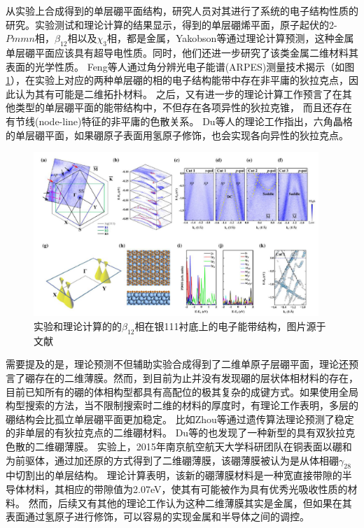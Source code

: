 从实验上合成得到的单层硼平面结构，研究人员对其进行了系统的电子结构性质的研究。实验测试和理论计算的结果显示，得到的单层硼烯平面，原子起伏的2-$Pmmn$相，$\beta_{12}$相以及$\chi_3$相，都是金属\cite{shu2016unveiling}，Yakobson等\cite{penev2016can}通过理论计算预测，这种金属单层硼平面应该具有超导电性质。同时，他们还进一步研究了该类金属二维材料其表面的光学性质\cite{huang2017two}。
Feng等\cite{feng2017dirac,feng2018discovery}人通过角分辨光电子能谱(ARPES)测量技术揭示（如图\ref{fig:ch1_boron_arpes}），在实验上对应的两种单层硼的相的电子结构能带中存在非平庸的狄拉克点，因此认为其有可能是二维拓扑材料。
之后，又有进一步的理论计算工作预言了在其他类型的单层硼平面的能带结构中，不但存在各项异性的狄拉克锥， 而且还存在有节线(node-line)特征的非平庸的色散关系\cite{zhang2017dirac}。
Du等\cite{jiao2016two}人的理论工作指出，六角晶格的单层硼平面，如果硼原子表面用氢原子修饰，也会实现各向异性的狄拉克点。

\begin{figure}
  \includegraphics[width=0.96\textwidth]{figs/ch1_boron_arpes.png}
  \centering
  \caption{实验和理论计算的的$\beta_{12}$相在银111衬底上的电子能带结构，图片源于文献\cite{feng2017dirac}}
  \label{fig:ch1_boron_arpes}
\end{figure}

需要提及的是，理论预测不但辅助实验合成得到了二维单原子层硼平面，理论还预言了硼存在的二维薄膜。然而，到目前为止并没有发现硼的层状体相材料的存在，目前已知所有的硼的体相构型都具有高配位的极其复杂的成键方式。如果使用全局构型搜索的方法，当不限制搜索时二维的材料的厚度时，有理论工作表明，多层的硼结构会比孤立单层硼平面更加稳定。
比如Zhou等\cite{zhou2014semimetallic}通过遗传算法理论预测了稳定的非单层的有狄拉克点的二维硼材料。
Du等\cite{ma2016graphene}的也发现了一种新型的具有双狄拉克色散的二维硼薄膜。
实验上，2015年南京航空航天大学科研团队在铜表面以硼和为前驱体，通过加还原的方式得到了二维硼薄膜\cite{tai2015synthesis}，该硼薄膜被认为是从体相硼$\gamma_{28}$中切割出的单层结构。
理论计算表明，该新的硼薄膜材料是一种宽直接带隙的半导体材料，其相应的带隙值为2.07eV，使其有可能被作为具有优秀光吸收性质的材料。
然而，后续又有其他的理论工作\cite{kou2016high}认为这种二维薄膜其实是金属，但如果在其表面通过氢原子进行修饰，可以容易的实现金属和半导体之间的调控。

